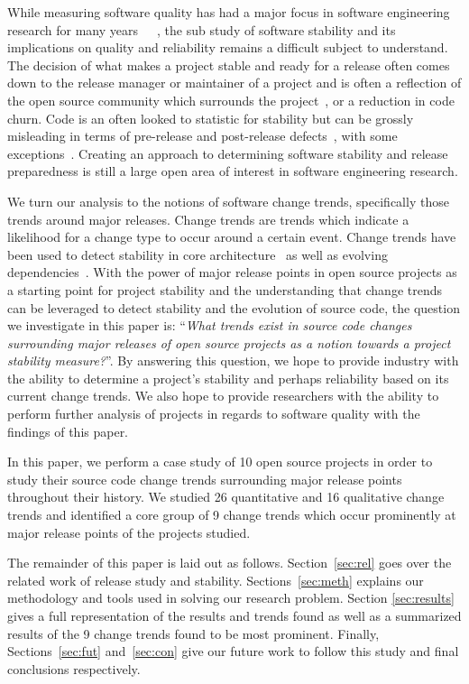 \documentclass[conference]{IEEEtran}
\begin{document}
While measuring software quality has had a major focus in software engineering research for many years~\cite{Bowen:1978:CAS}~\cite{Grady:1993:PRM}~\cite{ISOIEC9126},
the sub study of software stability and its implications on quality and reliability remains a difficult subject to understand. 
The decision of what makes a project stable and ready
for a release often comes down to the release manager or maintainer of a project and is often a reflection of the open source community which surrounds 
the project~\cite{Conway:1968}, or a reduction in code churn. Code is an often looked to statistic for stability but can be grossly misleading
in terms of pre-release and post-release defects~\cite{Fenton:2000:QAF}, with some exceptions~\cite{Nagappan:2005:URC}. 
Creating an approach to determining software stability and release preparedness is still a large open area of
interest in software engineering research.

We turn our analysis to the notions of software change trends, specifically those trends around major releases. Change trends are trends which indicate
a likelihood for a change type to occur around a certain event. Change trends have been used to detect
stability in core architecture~\cite{Wermelinger:2008:AEE} as well as evolving dependencies~\cite{Businge:2010:ESE}.
With the power of major release points in open source projects as a starting point for project stability and the understanding that change trends can
be leveraged to detect stability and the evolution of source code, the question we investigate in this paper is:
``\textit{What trends exist in source code changes surrounding major releases of open source projects as a notion towards a project
stability measure?}''. By answering this question, we hope to provide industry with the ability to determine a project's stability and perhaps
reliability based on its current change trends. We also hope to provide researchers with the ability to perform further analysis of projects in
regards to software quality with the findings of this paper.

In this paper, we perform a case study of 10 open source projects in order to study their source code change trends surrounding major release points
throughout their history. We studied 26 quantitative and 16 qualitative change trends and identified a core group of 9 change trends which occur
prominently at major release points of the projects studied.

The remainder of this paper is laid out as follows. Section~\ref{sec:rel} goes over the related work of release study and stability. Sections~\ref{sec:meth}
explains our methodology and tools used in solving our research problem.
Section \ref{sec:results} gives a full representation of the results and trends found as well as a summarized results of the 9 change trends found
to be most prominent. Finally, Sections~\ref{sec:fut} and~\ref{sec:con} give our future work to follow this study and final conclusions respectively.
\end{document}

